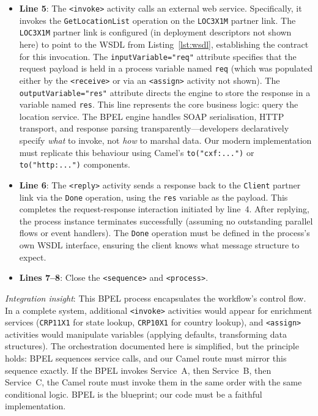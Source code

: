 \documentclass[11pt]{article}
\begin{document}
\begin{itemize}
  \item \textbf{Line 5}: The \texttt{<invoke>} activity calls an external web service. Specifically, it invokes the \texttt{GetLocationList} operation on the \texttt{LOC3X1M} partner link. The \texttt{LOC3X1M} partner link is configured (in deployment descriptors not shown here) to point to the WSDL from Listing~\ref{lst:wsdl}, establishing the contract for this invocation. The \texttt{inputVariable="req"} attribute specifies that the request payload is held in a process variable named \texttt{req} (which was populated either by the \texttt{<receive>} or via an \texttt{<assign>} activity not shown). The \texttt{outputVariable="res"} attribute directs the engine to store the response in a variable named \texttt{res}. This line represents the core business logic: query the location service. The BPEL engine handles SOAP serialisation, HTTP transport, and response parsing transparently—developers declaratively specify \emph{what} to invoke, not \emph{how} to marshal data. Our modern implementation must replicate this behaviour using Camel's \texttt{to("cxf:...")} or \texttt{to("http:...")} components.
  
  \item \textbf{Line 6}: The \texttt{<reply>} activity sends a response back to the \texttt{Client} partner link via the \texttt{Done} operation, using the \texttt{res} variable as the payload. This completes the request-response interaction initiated by line~4. After replying, the process instance terminates successfully (assuming no outstanding parallel flows or event handlers). The \texttt{Done} operation must be defined in the process's own WSDL interface, ensuring the client knows what message structure to expect.
  
  \item \textbf{Lines 7--8}: Close the \texttt{<sequence>} and \texttt{<process>}.
\end{itemize}

\noindent\emph{Integration insight}: This BPEL process encapsulates the workflow's control flow. In a complete system, additional \texttt{<invoke>} activities would appear for enrichment services (\texttt{CRP11X1} for state lookup, \texttt{CRP10X1} for country lookup), and \texttt{<assign>} activities would manipulate variables (applying defaults, transforming data structures). The orchestration documented here is simplified, but the principle holds: BPEL sequences service calls, and our Camel route must mirror this sequence exactly. If the BPEL invokes Service~A, then Service~B, then Service~C, the Camel route must invoke them in the same order with the same conditional logic. BPEL is the blueprint; our code must be a faithful implementation.
\end{document}
